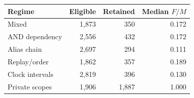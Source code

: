 \begin{tabular}{lrrr}
\toprule
Regime & Eligible & Retained & Median $F/M$\\
\midrule
Mixed & 1,873 & 350 & 0.172\\
AND dependency & 2,556 & 432 & 0.172\\
Alias chain & 2,697 & 294 & 0.111\\
Replay/order & 1,862 & 357 & 0.189\\
Clock intervals & 2,819 & 396 & 0.130\\
Private scopes & 1,906 & 1,887 & 1.000\\
\bottomrule
\end{tabular}
